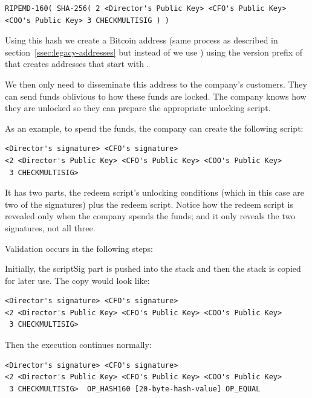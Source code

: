 \begin{emphbox}
\begin{lstlisting}[style=Pseudomath]
RIPEMD-160( SHA-256( 2 <Director's Public Key> <CFO's Public Key> 
<COO's Public Key> 3 CHECKMULTISIG ) )
\end{lstlisting}
\end{emphbox}

Using this hash we create a Bitcoin address (same process as described in section~\ref{ssec:legacy-addresses} but instead of  we use ) using the version prefix of  that creates addresses that start with . 

We then only need to disseminate this address to the company’s customers. They can send funds oblivious to how these funds are locked. The company knows how they are unlocked so they can prepare the appropriate unlocking script.

As an example, to spend the funds, the company can create the following script:

\begin{emphbox}
\begin{lstlisting}[style=Pseudomath]
<Director's signature> <CFO's signature> 
<2 <Director's Public Key> <CFO's Public Key> <COO's Public Key> 
 3 CHECKMULTISIG>
\end{lstlisting}
\end{emphbox}

It has two parts, the redeem script’s unlocking conditions (which in this case are two of the signatures) plus the redeem script. Notice how the redeem script is revealed only when the company spends the funds; and it only reveals the two signatures, not all three.

Validation occurs in the following steps:

Initially, the scriptSig part is pushed into the stack and then the stack is copied for later use. The copy would look like:

\begin{emphbox}
\begin{lstlisting}[style=Pseudomath]
<Director's signature> <CFO's signature>
<2 <Director's Public Key> <CFO's Public Key> <COO's Public Key>
 3 CHECKMULTISIG>
\end{lstlisting}
\end{emphbox}

Then the execution continues normally:

\begin{emphbox}
\begin{lstlisting}[style=Pseudomath]
<Director's signature> <CFO's signature>
<2 <Director's Public Key> <CFO's Public Key> <COO's Public Key>
 3 CHECKMULTISIG>  OP_HASH160 [20-byte-hash-value] OP_EQUAL
\end{lstlisting}
\end{emphbox}

